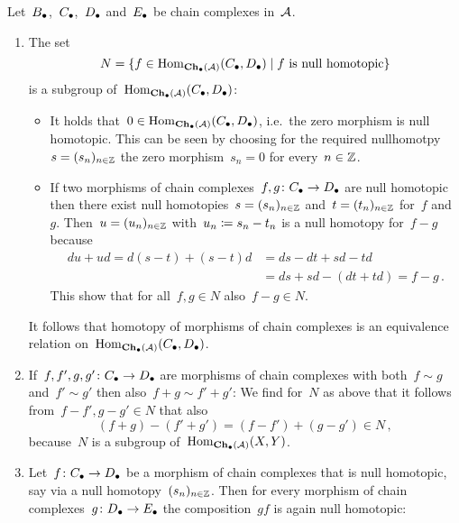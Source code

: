 \begin{remarkdefinition}
  \label{definition of homotopy category}
  Let~$B_\bullet$,~$C_\bullet$,~$D_\bullet$ and~$E_\bullet$ be chain complexes in~$\mathcal{A}$.
  \begin{enumerate}
    \item
      The set
      \[
          N
        = \{
            f \in \Hom_{\Ch(\Acat)}(\Ccc, \Dcc)
          \suchthat
            \text{$f$ is null homotopic}
          \}
      \]
      is a subgroup of~$\operatorname{Hom}_{\mathbf{Ch}_\bullet(\mathcal{A})}(C_\bullet, D_\bullet)$:
      \begin{itemize}
        \item
          It holds that~$0 \in \operatorname{Hom}_{\mathbf{Ch}_\bullet(\mathcal{A})}(C_\bullet, D_\bullet)$, i.e.\ the zero morphism is null homotopic.
          This can be seen by choosing for the required nullhomotpy~$s = (s_n)_{n \in \mathbb{Z}}$ the zero morphism~$s_n = 0$ for every~$n \in \mathbb{Z}$.
        \item
          If two morphisms of chain complexes~$f, g \colon C_\bullet \to D_\bullet$ are null homotopic then there exist null homotopies~$s = (s_n)_{n \in \mathbb{Z}}$ and~$t = (t_n)_{n \in \mathbb{Z}}$ for~$f$ and~$g$.
          Then~$u = (u_n)_{n \in \mathbb{Z}}$ with~$u_n \coloneqq s_n - t_n$ is a null homotopy for~$f - g$ because
          \begin{align*}
                du + ud
             =  d(s - t) + (s - t)d
            &=  ds - dt + sd - td \\
            &=  ds + sd - (dt + td)
             =  f - g \,.
          \end{align*}
          This show that for all~$f, g \in N$ also~$f - g \in N$.
      \end{itemize}
      It follows that homotopy of morphisms of chain complexes is an equivalence relation on~$\operatorname{Hom}_{\mathbf{Ch}_\bullet(\mathcal{A})}(C_\bullet, D_\bullet)$.
    \item
      \label{welldefinedness of sum}
      If~$f, f', g, g' \colon C_\bullet \to D_\bullet$ are morphisms of chain complexes with both~$f \sim g$ and~$f' \sim g'$ then also~$f + g \sim f' + g'$:
      We find for~$N$ as above that it follows from~$f - f', g - g' \in N$ that also
      \[
            (f + g) - (f' + g')
        =   (f - f') + (g - g')
        \in N \,,
      \]
      because~$N$ is a subgroup of~$\operatorname{Hom}_{\mathbf{Ch}_\bullet(\mathcal{A})}(X,Y)$.
    \item
      Let~$f \colon C_\bullet \to D_\bullet$ be a morphism of chain complexes that is null homotopic, say via a null homotopy~$(s_n)_{n \in \mathbb{Z}}$.
      Then for every morphism of chain complexes~$g \colon D_\bullet \to E_\bullet$ the composition~$gf$ is again null homotopic:

\end{enumerate}
\end{remarkdefinition}
